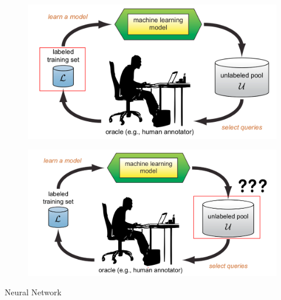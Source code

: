 \documentclass[10pt]{beamer}
\begin{document}
\begin{frame}[fragile]
    \begin{figure}[htp]
        \centering
        \includegraphics[scale=0.3]{images/active_learning_labeled.png}
    \end{figure}
\end{frame}

\begin{frame}[fragile]
    \begin{figure}[htp]
        \centering
        \includegraphics[scale=0.3]{images/active_learning_uncertainty.png}
    \end{figure}
\end{frame}

\begin{frame}[fragile]{Neural Network}
    
\end{frame}
\end{document}

